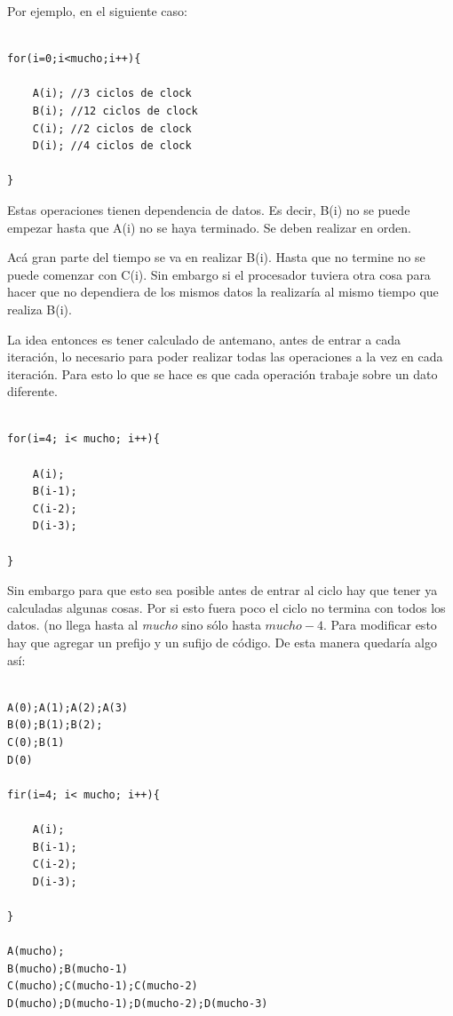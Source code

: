 	Por ejemplo, en el siguiente caso:

\lstset{language=C}

\begin{lstlisting}[frame=single]  % Start your code-block

for(i=0;i<mucho;i++){

	A(i); //3 ciclos de clock
	B(i); //12 ciclos de clock
	C(i); //2 ciclos de clock
	D(i); //4 ciclos de clock

}
\end{lstlisting}

	Estas operaciones tienen dependencia de datos. Es decir, B(i) no se puede empezar hasta
que A(i) no se haya terminado. Se deben realizar en orden.

	Acá gran parte del tiempo se va en realizar B(i). Hasta que no termine no se puede comenzar
con C(i). Sin embargo si el procesador tuviera otra cosa para hacer que no dependiera de los mismos
datos la realizaría al mismo tiempo que realiza B(i).

	La idea entonces es tener calculado de antemano, antes de entrar a cada iteración, lo necesario
para poder realizar todas las operaciones a la vez en cada iteración. Para esto lo que se hace 
es que cada operación trabaje sobre un dato diferente.

\begin{lstlisting}[frame=single]

for(i=4; i< mucho; i++){

	A(i);
	B(i-1);
	C(i-2);
	D(i-3);

}

\end{lstlisting}

	Sin embargo para que esto sea posible antes de entrar al ciclo hay que tener ya
calculadas algunas cosas. Por si esto fuera poco el ciclo no termina con todos los datos.
(no llega hasta al \textit{mucho} sino sólo hasta $mucho-4$. Para modificar
esto hay que agregar un prefijo y un sufijo de código. De esta manera quedaría algo
así:

\newpage

\begin{lstlisting}[frame=single]

A(0);A(1);A(2);A(3)
B(0);B(1);B(2);
C(0);B(1)
D(0)

fir(i=4; i< mucho; i++){

	A(i);
	B(i-1);
	C(i-2);
	D(i-3);

}

A(mucho);
B(mucho);B(mucho-1)
C(mucho);C(mucho-1);C(mucho-2)
D(mucho);D(mucho-1);D(mucho-2);D(mucho-3)


\end{lstlisting}

